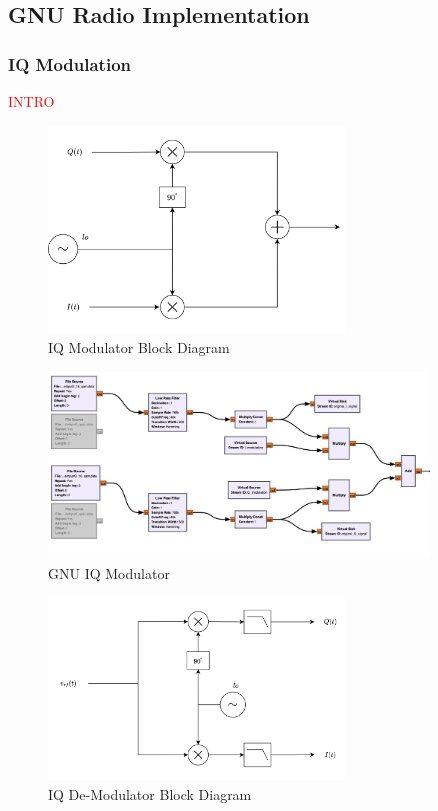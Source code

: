 \subsection{GNU Radio Implementation}

\subsubsection{IQ Modulation}

\textcolor{red}{INTRO}

\begin{figure}[H]
    \centering
    \includegraphics*[width=0.7\textwidth]{Images/IQ_Mod_Diagram.png}
    \caption{IQ Modulator Block Diagram}
    \label{fig:IQMod_Diagram}
\end{figure}

\begin{figure}[H]
    \centering
    \includegraphics*[width=0.9\textwidth]{Images/GNU_Digital_IQMod.png}
    \caption{GNU IQ Modulator}
    \label{fig:GNU_IQMod}
\end{figure}

\begin{figure}[H]
    \centering
    \includegraphics*[width=0.7\textwidth]{Images/IQ_Demod_Diagram.png}
    \caption{IQ De-Modulator Block Diagram}
    \label{fig:IQDeMod_Diagram}
\end{figure}

